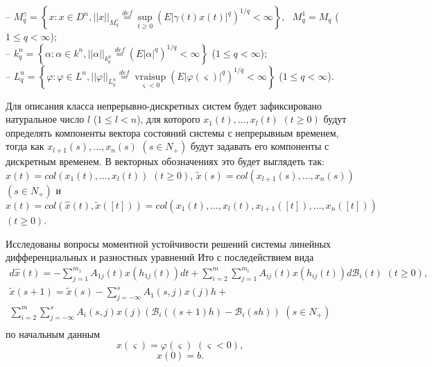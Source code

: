 --
$ M_q^{\gamma } = \left\{x: x \in D^n, ||x||_{M_q^\gamma }
 \mathrel
 {\mathop {=} \limits ^{def}} \mathrel {\mathop {\sup}
 \limits _{t
 \ge 0}} (E|\gamma (t)x(t)|^q)^{1/q} < \infty \right\},  \ \ \
 M_q^1 =  M_q$ ($1\le q <\infty$);\\
 -- $k_q^n = \left\{\alpha: \alpha \in k^n, ||\alpha ||_{k_q^n}
 \mathrel
 {\mathop {=} \limits ^{def}} (E|\alpha |^q)^{1/q} < \infty
 \right \}$ ($1\le q <\infty$);\\
 -- $ L_q^n = \left\{\varphi: \varphi \in L^n,
 ||\varphi||_{L_q^n}
 \mathrel {\mathop {=} \limits ^{def}} \mathrel {\mathop
 {v r a i \sup}
 \limits _{\varsigma < 0}}(E|\varphi (\varsigma ) |^q)^{1/q} < \infty
 \right\}$ ($1\le q <\infty$).


Для описания класса непрерывно-дискретных систем будет зафиксировано
натуральное число $l$ ($1 \le l < n$), для которого $x_1(t), \dots,
x_l(t)$ $ (t \ge 0)$ будут определять компоненты вектора состояний
системы с непрерывным временем, тогда как $x_{l+1}(s), \dots, x_n(s)$
$(s \in N_+)$ будут задавать его компоненты с дискретным временем. В
векторных обозначениях это будет выглядеть так: $\hat x(t) = col
(x_1(t), \dots, x_l(t))$ $(t \ge 0)$, $\tilde x(s) = col(x_{l+1}(s),
\dots, x_n(s))$ $ (s \in N_+)$ и $x(t) = col(\hat x(t), \tilde x([t]))
= col (x_1(t), \dots, x_l(t), x_{l+1}([t]), \dots, x_n([t]))$ $ (t \ge
0)$.


Исследованы вопросы моментной устойчивости решений системы линейных
дифференциальных и разностных уравнений Ито с последействием вида
\begin{equation}\label{kri-1}
\begin{array}{crl}
 d\hat x(t) = - \sum
 \limits_{j=1}^{m_1}A_{1j}(t)x(h_{1j}(t))dt +
 \sum \limits_{i=2}^m\sum \limits_{j=1}^{m_i}
 A_{ij}(t)x(h_{ij}(t))d\mathcal B_i(t) \, \, (t \ge 0),\\
\tilde x(s+1) = \tilde x(s) - \sum \limits _{j=-\infty }^{s}
A_{1}(s,j)x(j)h + \\
\sum \limits _{i=2}^{m}\sum \limits _{j=-\infty }^{s}
A_{i}(s,j)x(j)(\mathcal B_i((s+1)h) - \mathcal B_i(sh))\, \,  (s
\in N_+)\\
\end{array}
\end{equation}
по начальным данным
\begin{equation}\label{kri-1a}
x(\varsigma)=\varphi (\varsigma) {\,} {\,} (\varsigma < 0),
\end{equation}
\begin{equation}\label{kri-1b}
x(0) = b.
\end{equation}

